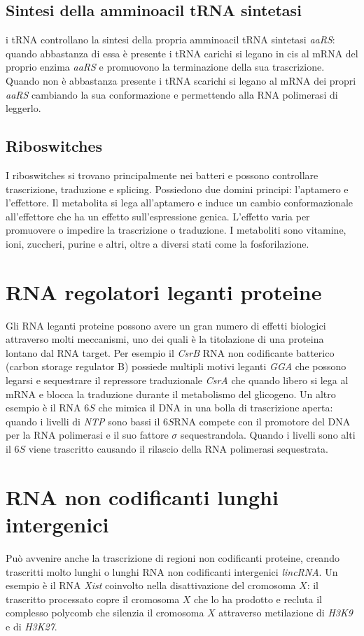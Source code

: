 \subsection{Sintesi della amminoacil tRNA sintetasi}
i tRNA controllano la sintesi della propria amminoacil tRNA sintetasi \emph{aaRS}: quando abbastanza di essa \`e presente i tRNA carichi si legano in cis al mRNA del proprio enzima 
\emph{aaRS} e promuovono la terminazione della sua trascrizione. Quando non \`e abbastanza presente i tRNA scarichi si legano al mRNA dei propri \emph{aaRS} cambiando la sua 
conformazione e permettendo alla RNA polimerasi di leggerlo. 
\subsection{Riboswitches}
I riboswitches si trovano principalmente nei batteri e possono controllare trascrizione, traduzione e splicing. Possiedono due domini principi: l'aptamero e l'effettore. Il metabolita
si lega all'aptamero e induce un cambio conformazionale all'effettore che ha un effetto sull'espressione genica. L'effetto varia per promuovere o impedire la trascrizione o 
traduzione. I metaboliti sono vitamine, ioni, zuccheri, purine e altri, oltre a diversi stati come la fosforilazione. 
\section{RNA regolatori leganti proteine}
Gli RNA leganti proteine possono avere un gran numero di effetti biologici attraverso molti meccanismi, uno dei quali \`e la titolazione di una proteina lontano dal RNA target. Per
esempio il \emph{CsrB} RNA non codificante batterico (carbon storage regulator B) possiede multipli motivi leganti \emph{GGA} che possono legarsi e sequestrare il repressore 
traduzionale \emph{CsrA} che quando libero si lega al mRNA e blocca la traduzione durante il metabolismo del glicogeno. Un altro esempio \`e il RNA $6S$ che mimica il DNA in una
bolla di trascrizione aperta: quando i livelli di \emph{NTP} sono bassi il $6S$RNA compete con il promotore del DNA per la RNA polimerasi e il suo fattore $\sigma$ sequestrandola. 
Quando i livelli sono alti il $6S$ viene trascritto causando il rilascio della RNA polimerasi sequestrata.
\section{RNA non codificanti lunghi intergenici}
Pu\`o avvenire anche la trascrizione di regioni non codificanti proteine, creando trascritti molto lunghi o lunghi RNA non codificanti intergenici \emph{lincRNA}. Un esempio \`e il RNA
\emph{Xist} coinvolto nella disattivazione del cromosoma $X$: il trascritto processato copre il cromosoma $X$ che lo ha prodotto e recluta il complesso polycomb che silenzia il cromosoma
$X$ attraverso metilazione di \emph{H3K9} e di \emph{H3K27}. 
